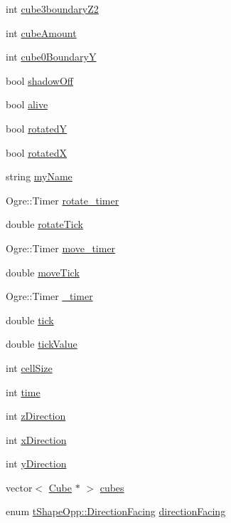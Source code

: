 \begin{DoxyCompactItemize}
\item 
int \hyperlink{classt_shape_opp_ab8ac52836e7f0798ed681b2ad862fbde}{cube3boundary\-Z2}
\item 
int \hyperlink{classt_shape_opp_abbdce7342b078dbd08d4fb8f3ce3b8ba}{cube\-Amount}
\item 
int \hyperlink{classt_shape_opp_aa09d7e2bf091902223eca13949282a3b}{cube0\-Boundary\-Y}
\item 
bool \hyperlink{classt_shape_opp_a90ab18a9bba27843937b91a8b03373bf}{shadow\-Off}
\item 
bool \hyperlink{classt_shape_opp_a24e206508358cfc34eef58a0fbb06435}{alive}
\item 
bool \hyperlink{classt_shape_opp_a92e70064fa7e0acbeb04e0821a1b1632}{rotated\-Y}
\item 
bool \hyperlink{classt_shape_opp_a01a922dad69591ec971aaf498d96e007}{rotated\-X}
\item 
string \hyperlink{classt_shape_opp_a0de718635fd734d2fa20597af3204527}{my\-Name}
\item 
Ogre\-::\-Timer \hyperlink{classt_shape_opp_a5696ae6155156237e595f099b4af69c2}{rotate\-\_\-timer}
\item 
double \hyperlink{classt_shape_opp_ae0510d4df7a5235e7bddde0f0ca04ce4}{rotate\-Tick}
\item 
Ogre\-::\-Timer \hyperlink{classt_shape_opp_a8df8a55d84408bce712043537c4b365e}{move\-\_\-timer}
\item 
double \hyperlink{classt_shape_opp_aea755ab737fed04de589062464599fd9}{move\-Tick}
\item 
Ogre\-::\-Timer \hyperlink{classt_shape_opp_a2f21d5931a40c7e5f349c62721183235}{\-\_\-timer}
\item 
double \hyperlink{classt_shape_opp_a68eacd52962b267f55bd0c63178615ee}{tick}
\item 
double \hyperlink{classt_shape_opp_a0716861dd8ce6a12339d038645343017}{tick\-Value}
\item 
int \hyperlink{classt_shape_opp_a2ce0ad0fad70827c369fa8ffae698bf3}{cell\-Size}
\item 
int \hyperlink{classt_shape_opp_aaa9b6325b31d0ce4af2e683f08fdc8de}{time}
\item 
int \hyperlink{classt_shape_opp_addec42a18fe788cd51dcc3045ec9a455}{z\-Direction}
\item 
int \hyperlink{classt_shape_opp_ac2eb74adf1ac7743b5c7e9162c398c26}{x\-Direction}
\item 
int \hyperlink{classt_shape_opp_a87294ad6c4634f1ac2ba4492a0951cf3}{y\-Direction}
\item 
vector$<$ \hyperlink{class_cube}{Cube} $\ast$ $>$ \hyperlink{classt_shape_opp_a6e70d444fb805aa6c1f27a3c3bc37e36}{cubes}
\item 
enum \hyperlink{classt_shape_opp_a066c267390282f939cd988fadd2e3516}{t\-Shape\-Opp\-::\-Direction\-Facing} \hyperlink{classt_shape_opp_a65e2aea9c7466331fc8adc48d7eb147c}{direction\-Facing}
\end{DoxyCompactItemize}


